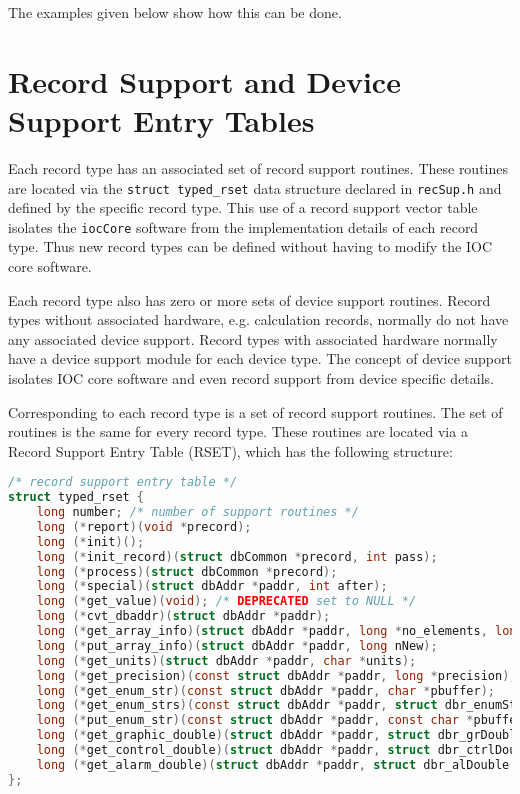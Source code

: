 The examples given below show how this can be done.

\section{Record Support and Device Support Entry Tables}

Each record type has an associated set of record support routines.
These routines are located via the \verb|struct typed_rset| data structure declared in \verb|recSup.h| and defined by the specific record type.
This use of a record support vector table isolates the \verb|iocCore| software from the implementation details of each record type.
Thus new record types can be defined without having to modify the IOC core software.

Each record type also has zero or more sets of device support routines.
Record types without associated hardware, e.g. calculation records, normally do not have any associated device support.
Record types with associated hardware normally have a  device support module for each device type.
The concept of device support isolates IOC core software and even record support from device specific details.

Corresponding to each record type is a set of record support routines.
The set of routines is the same for every record type.
These routines are located via a Record Support Entry Table (RSET), which has the following structure:

\begin{lstlisting}[language=C]
/* record support entry table */
struct typed_rset {
    long number; /* number of support routines */
    long (*report)(void *precord);
    long (*init)();
    long (*init_record)(struct dbCommon *precord, int pass);
    long (*process)(struct dbCommon *precord);
    long (*special)(struct dbAddr *paddr, int after);
    long (*get_value)(void); /* DEPRECATED set to NULL */
    long (*cvt_dbaddr)(struct dbAddr *paddr);
    long (*get_array_info)(struct dbAddr *paddr, long *no_elements, long *offset);
    long (*put_array_info)(struct dbAddr *paddr, long nNew);
    long (*get_units)(struct dbAddr *paddr, char *units);
    long (*get_precision)(const struct dbAddr *paddr, long *precision);
    long (*get_enum_str)(const struct dbAddr *paddr, char *pbuffer);
    long (*get_enum_strs)(const struct dbAddr *paddr, struct dbr_enumStrs *p);
    long (*put_enum_str)(const struct dbAddr *paddr, const char *pbuffer);
    long (*get_graphic_double)(struct dbAddr *paddr, struct dbr_grDouble *p);
    long (*get_control_double)(struct dbAddr *paddr, struct dbr_ctrlDouble *p);
    long (*get_alarm_double)(struct dbAddr *paddr, struct dbr_alDouble *p);
};
\end{lstlisting}

